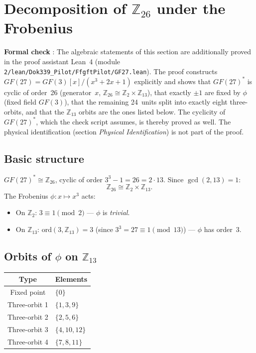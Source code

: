\section{Decomposition of $\mathbb{Z}_{26}$ under the Frobenius}

\noindent\textbf{Formal check} \LM: The algebraic statements of this section
are additionally proved in the proof assistant Lean~4 (module
\texttt{2/\allowbreak lean/\allowbreak Dok339\_Pilot/\allowbreak FfgftPilot/\allowbreak GF27.lean}). The proof constructs
$GF(27)=GF(3)[x]/(x^3+2x+1)$ explicitly and shows that $GF(27)^*$ is cyclic
of order~26 (generator~$x$, $\mathbb{Z}_{26}\cong\mathbb{Z}_2\times\mathbb{Z}_{13}$),
that exactly $\pm1$ are fixed by $\phi$ (fixed field $GF(3)$), that the
remaining 24~units split into exactly eight three-orbits, and that the
$\mathbb{Z}_{13}$ orbits are the ones listed below. The cyclicity of
$GF(27)^*$, which the check script assumes, is thereby proved as well. The
physical identification (section \emph{Physical Identification}) is not
part of the proof.

\subsection{Basic structure \BM\,\LM}

$GF(27)^*\cong\mathbb{Z}_{26}$, cyclic of order $3^3-1=26=2\cdot13$. Since
$\gcd(2,13)=1$:
\[
\mathbb{Z}_{26}\cong\mathbb{Z}_2\times\mathbb{Z}_{13}.
\]
The Frobenius $\phi:x\mapsto x^3$ acts:
\begin{itemize}
\item On $\mathbb{Z}_2$: $3\equiv1\pmod{2}$ — $\phi$ is \emph{trivial}.
\item On $\mathbb{Z}_{13}$: $\mathrm{ord}(3,\mathbb{Z}_{13})=3$ (since
  $3^3=27\equiv1\pmod{13}$) — $\phi$ has order~3.
\end{itemize}

\subsection{Orbits of $\phi$ on $\mathbb{Z}_{13}$ \BM\,\LM}

\begin{center}
\begin{tabular}{cl}
\toprule
Type & Elements \\
\midrule
Fixed point & $\{0\}$ \\
Three-orbit 1 & $\{1,3,9\}$ \\
Three-orbit 2 & $\{2,5,6\}$ \\
Three-orbit 3 & $\{4,10,12\}$ \\
Three-orbit 4 & $\{7,8,11\}$ \\
\bottomrule
\end{tabular}
\end{center}

